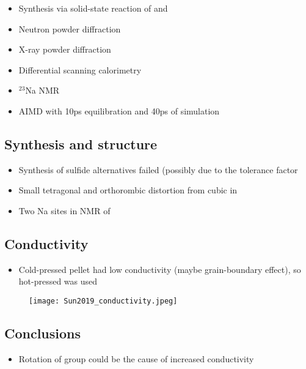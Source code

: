 \documentclass[10pt,a4paper, titlepage]{article}
\begin{document}
\begin{itemize}
  \item Synthesis via solid-state reaction of  and 
  \item Neutron powder diffraction
  \item X-ray powder diffraction
  \item Differential scanning calorimetry
  \item $^{23}$Na NMR
  \item AIMD with 10ps equilibration and 40ps of simulation
\end{itemize}

\subsection{Synthesis and structure}

\begin{itemize}
  \item Synthesis of sulfide alternatives failed (possibly due to the tolerance factor
  \item Small tetragonal and orthorombic distortion from cubic in  
  \item Two Na sites in NMR of 
\end{itemize}

\subsection{Conductivity}

\begin{itemize}
  \item Cold-pressed pellet had low conductivity (maybe grain-boundary effect), so hot-pressed was used
\end{itemize}

\begin{figure}[H]
\centering
\texttt{[image: Sun2019\_conductivity.jpeg]}
\end{figure}

\subsection{Conclusions}

\begin{itemize}
  \item Rotation of  group could be the cause of increased conductivity
\end{itemize}
\end{document}
